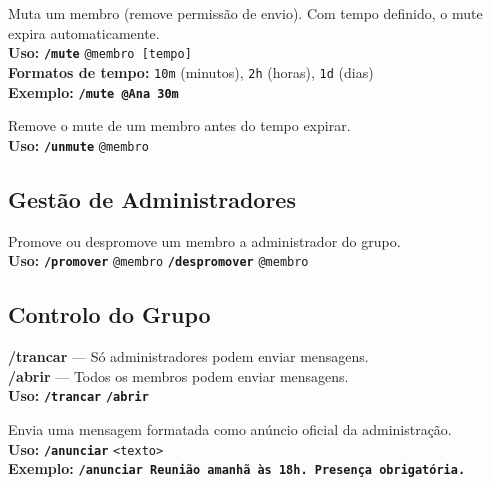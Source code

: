 \documentclass[12pt,a4paper]{article}
\newcommand{\cmd}[1]{\texttt{\textcolor{orbisblue}{\textbf{#1}}}}
\newcommand{\param}[1]{\texttt{\textcolor{orbisMid}{#1}}}
\begin{document}
\begin{tcolorbox}[cmdbox, title={\faVolumeMute\ /mute}]
Muta um membro (remove permissão de envio). Com tempo definido, o mute expira automaticamente.\\
\textbf{Uso:} \cmd{/mute} \param{@membro [tempo]}\\
\textbf{Formatos de tempo:} \param{10m} (minutos), \param{2h} (horas), \param{1d} (dias)\\
\textbf{Exemplo:} \cmd{/mute @Ana 30m}
\end{tcolorbox}

\begin{tcolorbox}[cmdbox, title={\faVolumeUp\ /unmute}]
Remove o mute de um membro antes do tempo expirar.\\
\textbf{Uso:} \cmd{/unmute} \param{@membro}
\end{tcolorbox}

\subsection{Gestão de Administradores}

\begin{tcolorbox}[cmdbox, title={\faCrown\ /promover \ e \ /despromover}]
Promove ou despromove um membro a administrador do grupo.\\
\textbf{Uso:} \cmd{/promover} \param{@membro} \quad \cmd{/despromover} \param{@membro}
\end{tcolorbox}

\subsection{Controlo do Grupo}

\begin{tcolorbox}[cmdbox, title={\faLock\ /trancar \ e \ \faLockOpen\ /abrir}]
\textbf{/trancar} — Só administradores podem enviar mensagens.\\
\textbf{/abrir} — Todos os membros podem enviar mensagens.\\
\textbf{Uso:} \cmd{/trancar} \quad \cmd{/abrir}
\end{tcolorbox}

\begin{tcolorbox}[cmdbox, title={\faBullhorn\ /anunciar}]
Envia uma mensagem formatada como anúncio oficial da administração.\\
\textbf{Uso:} \cmd{/anunciar} \param{<texto>}\\
\textbf{Exemplo:} \cmd{/anunciar Reunião amanhã às 18h. Presença obrigatória.}
\end{tcolorbox}
\end{document}
